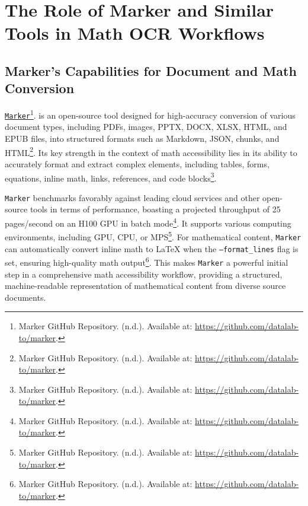 \section{The Role of Marker and Similar Tools in Math OCR Workflows}
\subsection{Marker's Capabilities for Document and Math Conversion}
\href{https://github.com/datalab-to/marker}{\texttt{Marker}}\footnote{Marker GitHub Repository. (n.d.). Available at: \url{https://github.com/datalab-to/marker}.}. is an open-source tool designed for high-accuracy conversion of various document types, including PDFs, images, PPTX, DOCX, XLSX, HTML, and EPUB files, into structured formats such as Markdown, JSON, chunks, and HTML\footnote{Marker GitHub Repository. (n.d.). Available at: \url{https://github.com/datalab-to/marker}.}. Its key strength in the context of math accessibility lies in its ability to accurately format and extract complex elements, including tables, forms, equations, inline math, links, references, and code blocks\footnote{Marker GitHub Repository. (n.d.). Available at: \url{https://github.com/datalab-to/marker}.}.

\texttt{Marker} benchmarks favorably against leading cloud services and other open-source tools in terms of performance, boasting a projected throughput of 25 pages/second on an H100 GPU in batch mode\footnote{Marker GitHub Repository. (n.d.). Available at: \url{https://github.com/datalab-to/marker}.}. It supports various computing environments, including GPU, CPU, or MPS\footnote{Marker GitHub Repository. (n.d.). Available at: \url{https://github.com/datalab-to/marker}.}. For mathematical content, \texttt{Marker} can automatically convert inline math to LaTeX when the \texttt{--format\_lines} flag is set, ensuring high-quality math output\footnote{Marker GitHub Repository. (n.d.). Available at: \url{https://github.com/datalab-to/marker}.}. This makes \texttt{Marker} a powerful initial step in a comprehensive math accessibility workflow, providing a structured, machine-readable representation of mathematical content from diverse source documents.

